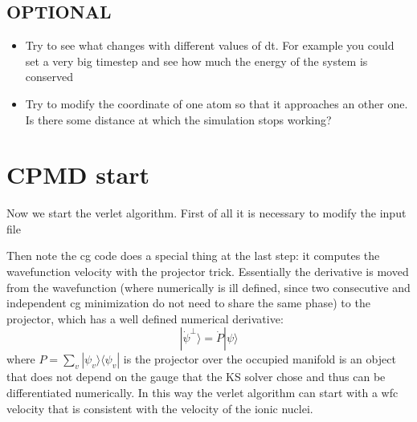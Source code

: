 \documentclass{article}
\begin{document}
\subsection{ OPTIONAL }
\begin{itemize}
    \item Try to see what changes with different values of dt. For example you could set a very big timestep and see how much the energy of the system is conserved
    \item Try to modify the coordinate of one atom so that it approaches an other one. Is there some distance at which the simulation stops working? 
\end{itemize}

\section{CPMD start}
Now we start the verlet algorithm. First of all it is necessary to modify the input file
Then note the cg code does a special thing at the last step: it computes the wavefunction velocity with the projector trick. Essentially the derivative is moved from the wavefunction (where numerically is ill defined, since two consecutive and independent cg minimization do not need to share the same phase) to the projector, which has a well defined numerical derivative:
\begin{equation}
    |\dot\psi^\perp \rangle = \dot P |\psi\rangle
\end{equation}
where $P=\sum_{v}|\psi_v\rangle\langle\psi_v|$ is the projector over the occupied manifold is an object that does not depend on the gauge that the KS solver chose and thus can be differentiated numerically. In this way the verlet algorithm can start with a wfc velocity that is consistent with the velocity of the ionic nuclei.
\end{document}
